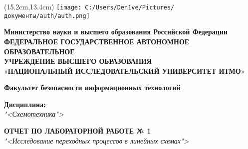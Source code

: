 \thispagestyle{empty}
\begin{textblock*}{5cm}(15.2cm,13.4cm) %
    \texttt{[image: C:/Users/Den1ve/Pictures/документы/auth/auth.png]} 
\end{textblock*}
\begin{center}
    \begin{sloppypar}
        {\fontsize{12}{14}\selectfont
        \textbf{{Министерство науки и высшего образования Российской Федерации}}\\
        \vspace{10pt}
        \textbf{ФЕДЕРАЛЬНОЕ ГОСУДАРСТВЕННОЕ АВТОНОМНОЕ ОБРАЗОВАТЕЛЬНОЕ\\УЧРЕЖДЕНИЕ ВЫСШЕГО ОБРАЗОВАНИЯ}\\
        «\textbf{НАЦИОНАЛЬНЫЙ ИССЛЕДОВАТЕЛЬСКИЙ УНИВЕРСИТЕТ ИТМО}»}
    \end{sloppypar}
    \vspace{30pt}

    \textbf{Факультет безопасности информационных технологий}
\end{center}

\vfill

\begin{center}
    \textbf{Дисциплина:} \\  
    \textit{"<Схемотехника">}

    \vspace{40pt}

    
    \uppercase{\textbf{Отчет по лабораторной работе № 1}}\\
    \textit{"<Исследование переходных процессов в линейных схемах">}

\end{center}


